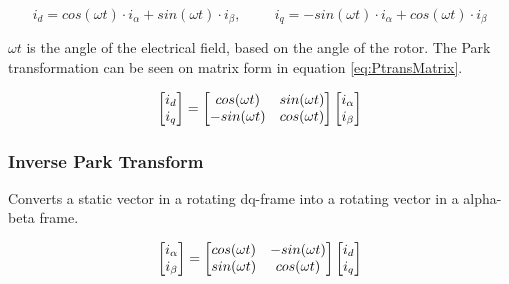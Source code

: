 \begin{equation}
    i_{d} = cos(\omega t) \cdot i_{\alpha} + sin(\omega t) \cdot i_{\beta}
    , \hspace{1cm}
    i_{q} = -sin(\omega t) \cdot i_{\alpha} + cos(\omega t) \cdot i_{\beta}
    \label{eq:park_transformation}
\end{equation}

$\omega t$ is the angle of the electrical field, based on the angle of the rotor.
The Park transformation can be seen on matrix form in equation \ref{eq:PtransMatrix}.


\begin{equation}
    \centering
    \begin{bmatrix}
        i_{d} \\ 
        i_{q}
    \end{bmatrix}
    =
    \begin{bmatrix}
       cos(\omega t) & sin(\omega t) \\
       -sin(\omega t) & cos(\omega t)
    \end{bmatrix}
    \begin{bmatrix}
        i_{\alpha} \\ 
        i_{\beta}
    \end{bmatrix}
    \label{eq:PtransMatrix}
\end{equation}





\subsubsection{Inverse Park Transform}
Converts a static vector in a rotating dq-frame into a rotating vector in a alpha-beta frame.

\begin{equation}
    \centering
    \begin{bmatrix}
        i_{\alpha} \\ 
        i_{\beta}
    \end{bmatrix}
    =
    \begin{bmatrix}
       cos(\omega t) & -sin(\omega t) \\
       sin(\omega t) & cos(\omega t)
    \end{bmatrix}
    \begin{bmatrix}
        i_{d} \\ 
        i_{q}
    \end{bmatrix}
\end{equation}

